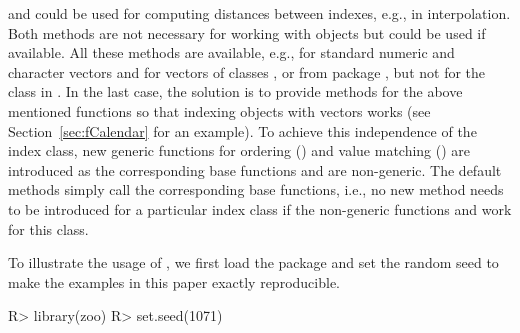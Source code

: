 \documentclass{Z}
\begin{document}
and  could be used for computing distances between indexes, e.g.,
in interpolation. Both methods are not necessary for working with  
objects but could be used if available.
All these methods are available, e.g., for standard numeric and character vectors and for
vectors of classes ,  or 
from package , but not for the class  in .
In the last case, the solution is to provide methods for the above mentioned
functions so that indexing  objects with  vectors works
(see Section~\ref{sec:fCalendar} for an example).
To achieve this  independence of the index class, new generic functions for
ordering () and value matching () are introduced
as the corresponding base functions  and  are 
non-generic. The default methods simply call the corresponding base functions, i.e.,
no new method needs to be introduced for a particular index class if the 
non-generic functions  and  work for this class.

To illustrate the usage of , we first load the package and set the
random seed to make the examples in this paper exactly reproducible.

\begin{Schunk}
\begin{Sinput}
R> library(zoo)
R> set.seed(1071)
\end{Sinput}
\end{Schunk}
\end{document}

